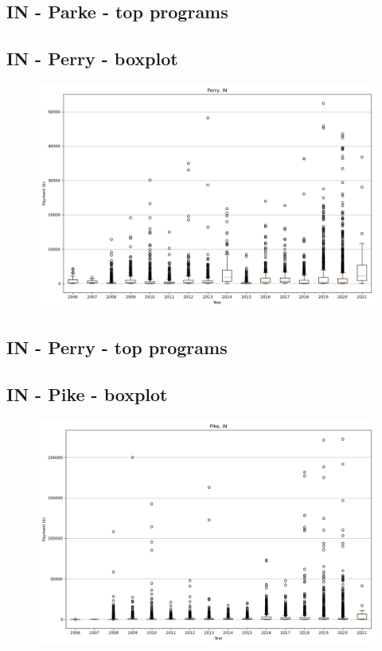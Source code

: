 \subsection*{IN - Parke - top programs}

\newpage
\subsection*{IN - Perry - boxplot}
\begin{figure}[h]
\centering
\includegraphics[width=7in]{../output/boxplots/counties/Perry-IN_boxplot.png}
\end{figure}


\subsection*{IN - Perry - top programs}

\newpage
\subsection*{IN - Pike - boxplot}
\begin{figure}[h]
\centering
\includegraphics[width=7in]{../output/boxplots/counties/Pike-IN_boxplot.png}
\end{figure}


